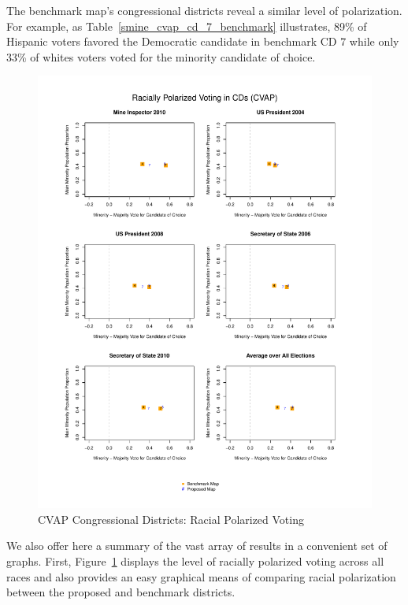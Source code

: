 \documentclass[12pt]{article}
\begin{document}
The benchmark map's congressional districts reveal a similar level of
polarization. For example, as Table~\ref{smine_cvap_cd_7_benchmark}
illustrates, 89\% of Hispanic voters favored the Democratic candidate
in benchmark CD 7 while only 33\% of whites voters voted for the
minority candidate of choice.

\begin{figure}[p!h]
  \begin{centering}
    \includegraphics[scale=.8]{figs/cvap_cd_polarization.pdf}
    \caption{\label{cvap_cd_polarization}CVAP Congressional Districts:
      Racial Polarized Voting}
  \end{centering}
\end{figure}

We also offer here a summary of the vast array of results in a
convenient set of graphs.  First, Figure~\ref{cvap_cd_polarization}
displays the level of racially polarized voting across all races and
also provides an easy graphical means of comparing racial polarization
between the proposed and benchmark districts.
\end{document}
